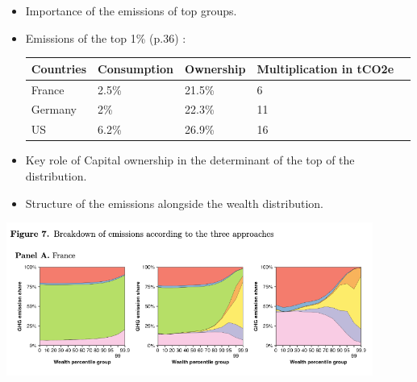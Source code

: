 \documentclass[10pt]{beamer}
\begin{document}
\begin{frame}{\subsecname}
    \begin{itemize}
        \item Importance of the emissions of top groups.
        \item Emissions of the top 1\% (p.36) :
        \begin{table}[!ht]
            \centering
            \begin{tabular}{|l|l|l|l|l|}
            \hline
                Countries & Consumption & Ownership & Multiplication in tCO2e \\ \hline
                France & 2.5\% & 21.5\% & 6 \\ \hline
                Germany & 2\% & 22.3\% & 11 \\ \hline
                US & 6.2\% & 26.9\% & 16 \\ \hline
            \end{tabular}
        \end{table}
        \item Key role of Capital ownership in the determinant of the top of the distribution.
        \item Structure of the emissions alongside the wealth distribution.
    \end{itemize}
\end{frame}

\begin{frame}{\subsecname}
    \begin{center}
        \includegraphics[width=0.9\textwidth]{../Figures/F71.png}
    \end{center}
\end{frame}
\end{document}
